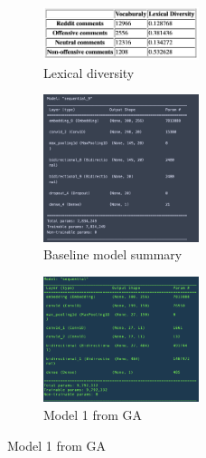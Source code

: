 \documentclass[11pt, natbib=false]{article}
\begin{document}
\newpage
\begin{figure}[h!]\ContinuedFloat
  \centering

  \begin{subfigure}[b]{1.0\linewidth}
  \centering
  \caption{Lexical diversity}
  \includegraphics[width=0.5\textwidth]{./lexical_diversity.png}
  \end{subfigure}

  \begin{subfigure}[b]{1.0\linewidth}
  \centering
  \caption{Baseline model summary}
  \includegraphics[width=0.5\textwidth]{./baseline_model.png}
  \end{subfigure}

  \begin{subfigure}[b]{1.0\linewidth}
  \centering
  \caption{Model 1 from GA}
  \includegraphics[width=0.5\textwidth]{./GA_model1.png}
  \end{subfigure}
\end{figure}
\end{document}
